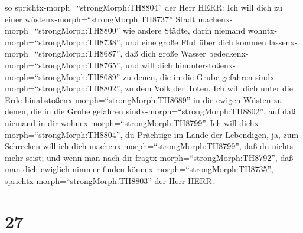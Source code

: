 so sprichtx-morph=``strongMorph:TH8804'' der Herr HERR: Ich will dich zu
einer wüstenx-morph=``strongMorph:TH8737'' Stadt
machenx-morph=``strongMorph:TH8800'' wie andere Städte, darin niemand
wohntx-morph=``strongMorph:TH8738'', und eine große Flut über dich
kommen lassenx-morph=``strongMorph:TH8687'', daß dich große Wasser
bedeckenx-morph=``strongMorph:TH8765'',  und will dich
hinunterstoßenx-morph=``strongMorph:TH8689'' zu denen, die in die Grube
gefahren sindx-morph=``strongMorph:TH8802'', zu dem Volk der Toten. Ich
will dich unter die Erde hinabstoßenx-morph=``strongMorph:TH8689'' in
die ewigen Wüsten zu denen, die in die Grube gefahren
sindx-morph=``strongMorph:TH8802'', auf daß niemand in dir
wohnex-morph=``strongMorph:TH8799''. Ich will
dichx-morph=``strongMorph:TH8804'', du Prächtige im Lande der
Lebendigen,  ja, zum Schrecken will ich dich
machenx-morph=``strongMorph:TH8799'', daß du nichts mehr seist; und wenn
man nach dir fragtx-morph=``strongMorph:TH8792'', daß man dich ewiglich
nimmer finden könnex-morph=``strongMorph:TH8735'',
sprichtx-morph=``strongMorph:TH8803'' der Herr HERR.

\hypertarget{section-26}{%
\section{27}\label{section-26}}

